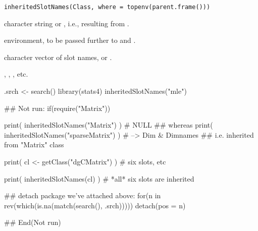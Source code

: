 %
\begin{Usage}
\begin{verbatim}
inheritedSlotNames(Class, where = topenv(parent.frame()))
\end{verbatim}
\end{Usage}
%
\begin{Arguments}
\begin{ldescription}
\item[\code{Class}] character string or
, i.e., resulting from
.
\item[\code{where}] environment, to be passed further to
 and .
\end{ldescription}
\end{Arguments}
%
\begin{Value}
character vector of slot names, or .
\end{Value}
%
\begin{SeeAlso}\relax
{}, , , etc.
\end{SeeAlso}
%
\begin{Examples}
\begin{ExampleCode}
.srch <- search()
library(stats4)
inheritedSlotNames("mle")


## Not run: 
if(require("Matrix")) {
  print( inheritedSlotNames("Matrix") ) # NULL
  ## whereas
  print( inheritedSlotNames("sparseMatrix") ) # --> Dim & Dimnames
  ##  i.e. inherited from "Matrix" class

  print( cl <- getClass("dgCMatrix") ) # six slots, etc

  print( inheritedSlotNames(cl) ) # *all* six slots are inherited
}


## detach package we've attached above:
for(n in rev(which(is.na(match(search(), .srch)))))
    detach(pos = n)

## End(Not run)
\end{ExampleCode}
\end{Examples}
